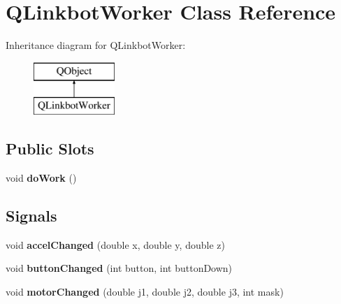 \hypertarget{class_q_linkbot_worker}{\section{Q\-Linkbot\-Worker Class Reference}
\label{class_q_linkbot_worker}
}
Inheritance diagram for Q\-Linkbot\-Worker\-:\begin{figure}[H]
\begin{center}
\leavevmode
\includegraphics[height=2.000000cm]{class_q_linkbot_worker}
\end{center}
\end{figure}
\subsection*{Public Slots}
\begin{DoxyCompactItemize}
\item 
\hypertarget{class_q_linkbot_worker_a36ad2672be55711016508b62237449fc}{void {\bfseries do\-Work} ()}\label{class_q_linkbot_worker_a36ad2672be55711016508b62237449fc}

\end{DoxyCompactItemize}
\subsection*{Signals}
\begin{DoxyCompactItemize}
\item 
\hypertarget{class_q_linkbot_worker_a7e7b07ddc566a45d3b4be92bae37cfc4}{void {\bfseries accel\-Changed} (double x, double y, double z)}\label{class_q_linkbot_worker_a7e7b07ddc566a45d3b4be92bae37cfc4}

\item 
\hypertarget{class_q_linkbot_worker_a9233a3905a96f73484d0fa269e59f2c3}{void {\bfseries button\-Changed} (int button, int button\-Down)}\label{class_q_linkbot_worker_a9233a3905a96f73484d0fa269e59f2c3}

\item 
\hypertarget{class_q_linkbot_worker_a2c7f4271721afe32fef9a91cf2b44b94}{void {\bfseries motor\-Changed} (double j1, double j2, double j3, int mask)}\label{class_q_linkbot_worker_a2c7f4271721afe32fef9a91cf2b44b94}

\end{DoxyCompactItemize}
